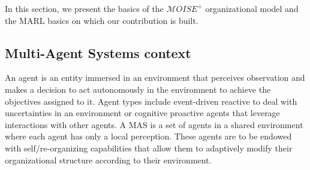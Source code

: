 


In this section, we present the basics of the $\mathcal{M}OISE^+$ organizational model and the MARL basics on which our contribution is built.

\subsection{Multi-Agent Systems context}


An agent is an entity immersed in an environment that perceives observation and makes a decision to act autonomously in the environment to achieve the objectives assigned to it.
Agent types include event-driven reactive to deal with uncertainties in an environment or cognitive proactive agents that leverage interactions with other agents. A MAS is a set of agents in a shared environment where each agent has only a local perception. These agents are to be endowed with self/re-organizing capabilities that allow them to adaptively modify their organizational structure according to their environment.

